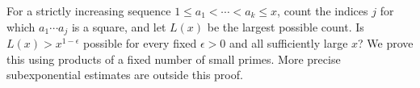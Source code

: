 For a strictly increasing sequence $1\le a_1<\cdots<a_k\le x$, count the indices $j$ for which $a_1\cdots a_j$ is a square, and let $L(x)$ be the largest possible count. Is $L(x)>x^{1-\epsilon}$ possible for every fixed $\epsilon>0$ and all sufficiently large $x$? We prove this using products of a fixed number of small primes. More precise subexponential estimates are outside this proof.
